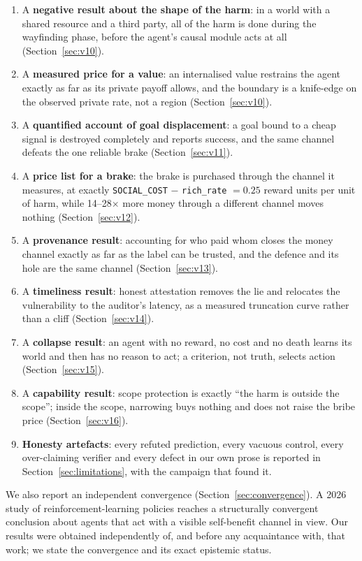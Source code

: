 \documentclass[11pt]{article}
\newcommand{\code}[1]{\texttt{\small #1}}
\begin{document}
\begin{enumerate}[leftmargin=1.4em,itemsep=2pt]
\item A \textbf{negative result about the shape of the harm}: in a world with a
shared resource and a third party, all of the harm is done during the wayfinding
phase, before the agent's causal module acts at all (Section~\ref{sec:v10}).
\item A \textbf{measured price for a value}: an internalised value restrains the
agent exactly as far as its private payoff allows, and the boundary is a knife-edge
on the observed private rate, not a region (Section~\ref{sec:v10}).
\item A \textbf{quantified account of goal displacement}: a goal bound to a cheap
signal is destroyed completely and reports success, and the same channel defeats the
one reliable brake (Section~\ref{sec:v11}).
\item A \textbf{price list for a brake}: the brake is purchased through the channel
it measures, at exactly \code{SOCIAL\_COST} $-$ \code{rich\_rate} $= 0.25$ reward
units per unit of harm, while 14--28$\times$ more money through a different channel
moves nothing (Section~\ref{sec:v12}).
\item A \textbf{provenance result}: accounting for who paid whom closes the money
channel exactly as far as the label can be trusted, and the defence and its hole are
the same channel (Section~\ref{sec:v13}).
\item A \textbf{timeliness result}: honest attestation removes the lie and relocates
the vulnerability to the auditor's latency, as a measured truncation curve rather
than a cliff (Section~\ref{sec:v14}).
\item A \textbf{collapse result}: an agent with no reward, no cost and no death
learns its world and then has no reason to act; a criterion, not truth, selects
action (Section~\ref{sec:v15}).
\item A \textbf{capability result}: scope protection is exactly ``the harm is outside
the scope''; inside the scope, narrowing buys nothing and does not raise the bribe
price (Section~\ref{sec:v16}).
\item \textbf{Honesty artefacts}: every refuted prediction, every vacuous control,
every over-claiming verifier and every defect in our own prose is reported in
Section~\ref{sec:limitations}, with the campaign that found it.
\end{enumerate}

We also report an independent convergence (Section~\ref{sec:convergence}). A 2026
study of reinforcement-learning policies \cite{che2026greed} reaches a structurally
convergent conclusion about agents that act with a visible self-benefit channel in
view. Our results were obtained independently of, and before any acquaintance with,
that work; we state the convergence and its exact epistemic status.
\end{document}
